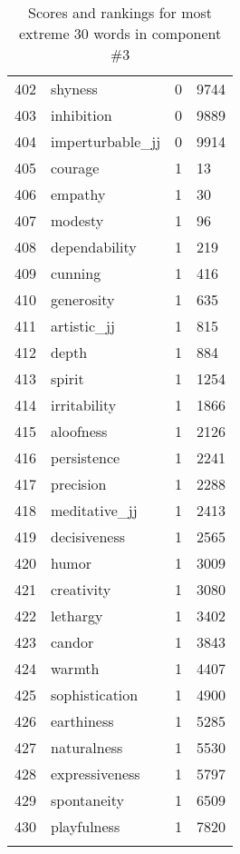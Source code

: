 \begin{longtable}[!htbp]{| rlr@{.}l |}
    402 & shyness & 0 & 9744 \\
    403 & inhibition & 0 & 9889 \\
    404 & imperturbable\_jj & 0 & 9914 \\
    405 & courage & 1 & 13 \\
    406 & empathy & 1 & 30 \\
    407 & modesty & 1 & 96 \\
    408 & dependability & 1 & 219 \\
    409 & cunning & 1 & 416 \\
    410 & generosity & 1 & 635 \\
    411 & artistic\_jj & 1 & 815 \\
    412 & depth & 1 & 884 \\
    413 & spirit & 1 & 1254 \\
    414 & irritability & 1 & 1866 \\
    415 & aloofness & 1 & 2126 \\
    416 & persistence & 1 & 2241 \\
    417 & precision & 1 & 2288 \\
    418 & meditative\_jj & 1 & 2413 \\
    419 & decisiveness & 1 & 2565 \\
    420 & humor & 1 & 3009 \\
    421 & creativity & 1 & 3080 \\
    422 & lethargy & 1 & 3402 \\
    423 & candor & 1 & 3843 \\
    424 & warmth & 1 & 4407 \\
    425 & sophistication & 1 & 4900 \\
    426 & earthiness & 1 & 5285 \\
    427 & naturalness & 1 & 5530 \\
    428 & expressiveness & 1 & 5797 \\
    429 & spontaneity & 1 & 6509 \\
    430 & playfulness & 1 & 7820 \\
    \hline
    \caption{Scores and rankings for most extreme 30 words in component \#3} \\
\end{longtable}
